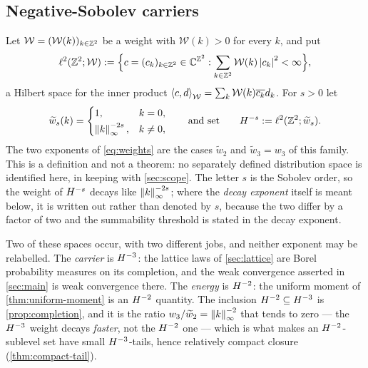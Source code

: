 \subsection{Negative-Sobolev carriers}

\begin{definition}\label{def:carrier-hs}
Let $\mathcal W=(\mathcal W(k))_{k\in\mathbb{Z}^2}$ be a weight with $\mathcal W(k)>0$
for every $k$, and put
\begin{equation}\label{eq:ell2s}
  \ell^2(\mathbb{Z}^2;\mathcal W):=
  \Bigl\{c=(c_k)_{k\in\mathbb{Z}^2}\in\mathbb{C}^{\mathbb{Z}^2}:
  \sum_{k\in\mathbb{Z}^2}\mathcal W(k)\left| c_k \right|^2<\infty\Bigr\},
\end{equation}
a Hilbert space for the inner product
$\left\langle c, d \right\rangle_{\mathcal W}=\sum_k\mathcal W(k)\overline{c_k}d_k$. For $s>0$ let
\begin{equation}\label{eq:full-weight-family}
  \widetilde w_s(k)=
  \begin{cases}
    1, & k=0,\\[2pt]
    \left\| k \right\|_\infty^{-2s}, & k\neq0,
  \end{cases}
  \qquad\text{and set}\qquad
  H^{-s}:=\ell^2(\mathbb{Z}^2;\widetilde w_s).
\end{equation}
The two exponents of \eqref{eq:weights} are the cases $\widetilde w_2$ and
$\widetilde w_3=w_3$ of this family. This is a definition and not a theorem: no
separately defined distribution space is identified here, in keeping with
\cref{sec:scope}. The letter $s$ is the Sobolev order, so the weight of
$H^{-s}$ decays like $\left\| k \right\|_\infty^{-2s}$; where the \emph{decay exponent}
itself is meant below, it is written out rather than denoted by $s$, because the
two differ by a factor of two and the summability threshold is stated in the
decay exponent.
\end{definition}

Two of these spaces occur, with two different jobs, and neither exponent may be
relabelled. The \emph{carrier} is $H^{-3}$: the lattice laws of
\cref{sec:lattice} are Borel probability measures on its completion, and the weak
convergence asserted in \cref{sec:main} is weak convergence there. The
\emph{energy} is $H^{-2}$: the uniform moment of \cref{thm:uniform-moment} is an
$H^{-2}$ quantity. The inclusion $H^{-2}\subseteq H^{-3}$ is
\cref{prop:completion}, and it is the ratio $w_3/\widetilde w_2=\left\| k \right\|_\infty^{-2}$
that tends to zero --- the $H^{-3}$ weight decays \emph{faster}, not the $H^{-2}$ one ---
which is what makes an $H^{-2}$-sublevel set have small $H^{-3}$-tails, hence
relatively compact closure (\cref{thm:compact-tail}).

